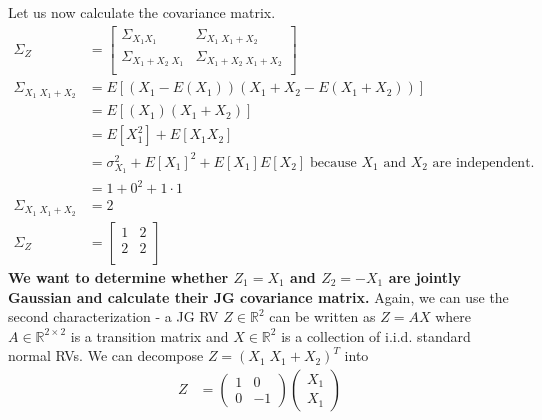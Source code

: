 \documentclass[10pt,a4paper]{article}
\begin{document}
Let us now calculate the covariance matrix.
\begin{align*}
  \Sigma_{Z} &= \begin{bmatrix}
                  \Sigma_{X_{1}X_{1}} & \Sigma_{X_1\; X_1 + X_2} \\
                  \Sigma_{X_1 + X_2\; X_1} & \Sigma_{X_1 + X_2 \; X_1 + X_2} \\
                \end{bmatrix}& \\
  \Sigma_{X_1\; X_1 + X_2} &= E[(X_1 - E(X_1))(X_1 + X_2 - E(X_1 + X_2))]&\\
                           &= E[(X_1)(X_1 + X_2)]& \\
                           &= E[X_1^2] + E[X_{1}X_{2}] \\
                           &= \sigma^2_{X_1} + E[X_1]^2 + E[X_{1}]E[X_{2}] \; \text{because $X_1$ and $X_2$ are independent.}\\
                           &= 1 + 0^2 + 1 \cdot 1 \\
  \Sigma_{X_1\; X_1 + X_2} &= 2& \\
  \Sigma_{Z} &= \begin{bmatrix}
                  1 & 2 \\
                  2 & 2 \\
                \end{bmatrix}&
\end{align*}
\textbf{We want to determine whether $Z_{1} = X_{1}$ and $Z_{2} = -X_{1}$ are jointly Gaussian and calculate their JG covariance matrix.}
Again, we can use the second characterization - a JG RV $Z \in \mathbb{R}^{2}$ can be written as $Z = AX$ where $A \in \mathbb{R}^{2 \times 2}$ is a transition matrix and $X \in \mathbb{R}^{2}$ is a collection of i.i.d. standard normal RVs. We can decompose $Z = (X_{1} \; X_1 + X_2)^{T}$ into
\begin{align*}
  Z &= \begin{pmatrix}
          1 & 0 \\
          0 & -1
       \end{pmatrix}
       \begin{pmatrix}
         X_1 \\
         X_1
       \end{pmatrix}
\end{align*}
\end{document}
